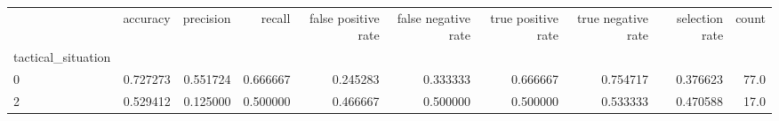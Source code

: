 \begin{tabular}{lrrrrrrrrr}
\toprule
{} &  accuracy &  precision &    recall &  false positive rate &  false negative rate &  true positive rate &  true negative rate &  selection rate &  count \\
tactical\_situation &           &            &           &                      &                      &                     &                     &                 &        \\
\midrule
0                  &  0.727273 &   0.551724 &  0.666667 &             0.245283 &             0.333333 &            0.666667 &            0.754717 &        0.376623 &   77.0 \\
2                  &  0.529412 &   0.125000 &  0.500000 &             0.466667 &             0.500000 &            0.500000 &            0.533333 &        0.470588 &   17.0 \\
\bottomrule
\end{tabular}
